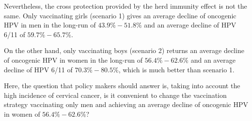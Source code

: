 Nevertheless, the cross protection provided by the herd immunity effect is not the same. Only vaccinating girls (scenario 1) gives an average decline of oncogenic HPV in men in the long-run of $43.9\%-51.8\%$ and an average decline of HPV 6/11 of $59.7\%-65.7\%$.

On the other hand, only vaccinating boys (scenario 2) returns an average decline of oncogenic HPV in women in the long-run of $56.4\%-62.6\%$ and an average decline of HPV 6/11 of $70.3\%-80.5\%$, which is much better than scenario 1.

Here, the question that policy makers should answer is, taking into account the high incidence of cervical cancer, is it convenient to change the vaccination strategy vaccinating only men and achieving an average decline of oncogenic HPV in women of $56.4\%-62.6\%$? 

